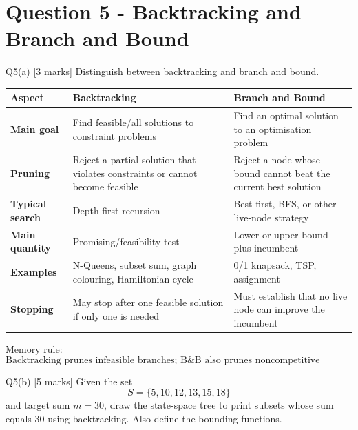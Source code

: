 \documentclass[10.5pt,a4paper]{article}
\begin{document}
\section{Question 5 - Backtracking and Branch and Bound}

\begin{questionbox}{Q5(a) [3 marks]}
Distinguish between backtracking and branch and bound.
\end{questionbox}

\begin{answerbox}
\begin{center}
\small
\begin{tabularx}{0.96\textwidth}{>{\bfseries}p{3.0cm}XX}
\toprule
Aspect & Backtracking & Branch and Bound\\
\midrule
Main goal & Find feasible/all solutions to constraint problems & Find an optimal solution to an optimisation problem\\
Pruning & Reject a partial solution that violates constraints or cannot become feasible & Reject a node whose bound cannot beat the current best solution\\
Typical search & Depth-first recursion & Best-first, BFS, or other live-node strategy\\
Main quantity & Promising/feasibility test & Lower or upper bound plus incumbent\\
Examples & N-Queens, subset sum, graph colouring, Hamiltonian cycle & 0/1 knapsack, TSP, assignment\\
Stopping & May stop after one feasible solution if only one is needed & Must establish that no live node can improve the incumbent\\
\bottomrule
\end{tabularx}
\end{center}

Memory rule:
\[
\boxed{\text{Backtracking prunes infeasible branches; B\&B also prunes noncompetitive branches.}}
\]
\end{answerbox}

\begin{questionbox}{Q5(b) [5 marks]}
Given the set
\[
S=\{5,10,12,13,15,18\}
\]
and target sum $m=30$, draw the state-space tree to print subsets whose sum equals $30$ using backtracking. Also define the bounding functions.
\end{questionbox}
\end{document}
